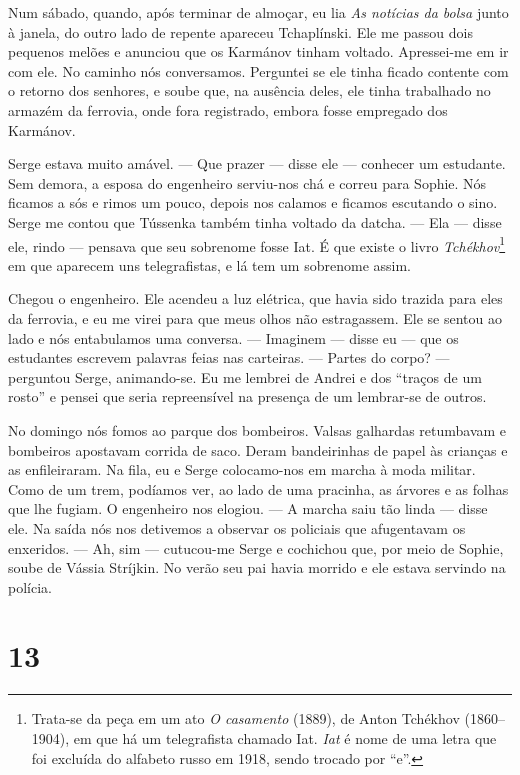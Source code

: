 Num sábado, quando, após terminar de almoçar, eu lia \emph{As notícias
da bolsa} junto à janela, do outro lado de repente apareceu Tchaplínski.
Ele me passou dois pequenos melões e anunciou que os Karmánov tinham
voltado. Apressei-me em ir com ele. No caminho nós conversamos.
Perguntei se ele tinha ficado contente com o retorno dos senhores, e
soube que, na ausência deles, ele tinha trabalhado no armazém da
ferrovia, onde fora registrado, embora fosse empregado dos Karmánov.

Serge estava muito amável. --- Que prazer --- disse ele --- conhecer um
estudante. Sem demora, a esposa do engenheiro serviu-nos chá e correu
para Sophie. Nós ficamos a sós e rimos um pouco, depois nos calamos e
ficamos escutando o sino. Serge me contou que Tússenka também tinha
voltado da datcha. --- Ela --- disse ele, rindo --- pensava que seu
sobrenome fosse Iat. É que existe o livro \emph{Tchékhov}\footnote{Trata-se
  da peça em um ato \emph{O casamento} (1889), de Anton Tchékhov
  (1860--1904), em que há um telegrafista chamado Iat. \emph{Iat} é nome
  de uma letra que foi excluída do alfabeto russo em 1918, sendo trocado
  por ``e''.} em que aparecem uns telegrafistas, e lá tem um sobrenome
assim.

Chegou o engenheiro. Ele acendeu a luz elétrica, que havia sido trazida
para eles da ferrovia, e eu me virei para que meus olhos não
estragassem. Ele se sentou ao lado e nós entabulamos uma conversa. ---
Imaginem --- disse eu --- que os estudantes escrevem palavras feias nas
carteiras. --- Partes do corpo? --- perguntou Serge, animando-se. Eu me
lembrei de Andrei e dos ``traços de um rosto'' e pensei que seria
repreensível na presença de um lembrar-se de outros.

No domingo nós fomos ao parque dos bombeiros. Valsas galhardas
retumbavam e bombeiros apostavam corrida de saco. Deram bandeirinhas de
papel às crianças e as enfileiraram. Na fila, eu e Serge colocamo-nos em
marcha à moda militar. Como de um trem, podíamos ver, ao lado de uma
pracinha, as árvores e as folhas que lhe fugiam. O engenheiro nos
elogiou. --- A marcha saiu tão linda --- disse ele. Na saída nós nos
detivemos a observar os policiais que afugentavam os enxeridos. --- Ah,
sim --- cutucou-me Serge e cochichou que, por meio de Sophie, soube de
Vássia Stríjkin. No verão seu pai havia morrido e ele estava servindo na
polícia.

\section{13}

